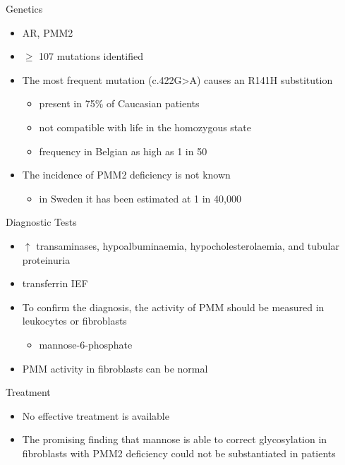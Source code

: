 \documentclass[presentation, smaller]{beamer}
\begin{document}
\begin{frame}[label={sec:orgdc602f3}]{Genetics}
\begin{itemize}
\item AR, PMM2
\item \(\ge\) 107 mutations identified
\item The most frequent mutation (c.422G>A) causes an R141H substitution
\begin{itemize}
\item present in 75\% of Caucasian patients
\item not compatible with life in the homozygous state
\item frequency in Belgian as high as 1 in 50
\end{itemize}
\item The incidence of PMM2 deficiency is not known
\begin{itemize}
\item in Sweden it has been estimated at 1 in 40,000
\end{itemize}
\end{itemize}
\end{frame}

\begin{frame}[label={sec:orge0b0d9f}]{Diagnostic Tests}
\begin{itemize}
\item \(\uparrow\) transaminases, hypoalbuminaemia, hypocholesterolaemia, and
tubular proteinuria
\item transferrin IEF
\item To confirm the diagnosis, the activity of PMM should be measured in
leukocytes or fibroblasts
\begin{itemize}
\item\relax [2-H\(^{\text{3}}\)]mannose-6-phosphate
\end{itemize}
\item PMM activity in fibroblasts can be normal
\end{itemize}
\end{frame}

\begin{frame}[label={sec:orgbc211f6}]{Treatment}
\begin{itemize}
\item No effective treatment is available
\item The promising finding that mannose is able to correct glycosylation
in fibroblasts with PMM2 deficiency could not be substantiated in
patients
\end{itemize}
\end{frame}
\end{document}
